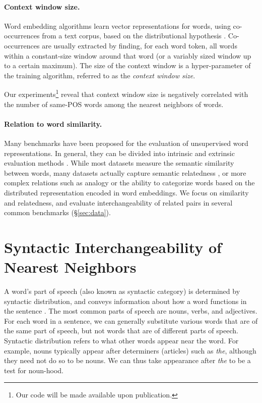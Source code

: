 \documentclass[11pt,a4paper]{article}
\begin{document}
    \paragraph{Context window size.}
    Word embedding algorithms learn vector representations for words,
    using co-occurrences from a text corpus,
    based on the distributional hypothesis \cite{harris1954distributional}.
    Co-occurrences are usually extracted by finding, for each word token, all
    words within a constant-size window around that word (or a variably sized
    window up to a certain maximum).
    The size of the context window is a hyper-parameter of the training algorithm,
    referred to as the \textit{context window size}.

    Our experiments\footnote{Our code will be made available upon publication.}
    reveal that context window size is negatively correlated
    with the number of same-POS words among the nearest neighbors of words.
    
    \paragraph{Relation to word similarity.}
    
    Many benchmarks have been proposed for the evaluation of unsupervised word
    representations.
    In general, they can be divided into intrinsic and extrinsic evaluation methods
    \cite{schnabel2015evaluation,chiu2016intrinsic,jastrzebski2017evaluate,alshargi2018concept2vec,bakarov2018survey}.
    While most datasets measure the semantic similarity between words,
    many datasets actually capture semantic relatedness
    \cite{hill2015simlex,avraham2016improving},
    or more complex relations such as analogy or the ability to categorize
    words based on the distributed representation encoded in word embeddings.
    We focus on similarity and relatedness, and evaluate interchangeability
    of related pairs in several common benchmarks (\S\ref{sec:data}).
    
    \section{Syntactic Interchangeability of Nearest Neighbors}\label{sec:nn}
    
    A word's part of speech (also known as syntactic category)
    is determined by syntactic distribution, and
    conveys information about how a word functions in the sentence \cite{carnie2002syntax}.
    The most common parts of speech are nouns, verbs, and adjectives.
    For each word in a sentence,
    we can generally substitute various words that are of the same part of speech,
    but not words that are of different parts of speech.
    Syntactic distribution refers to what other words appear
    near the word. For example, nouns typically appear after determiners (articles)
    such as \textit{the}, although they need not do so to be nouns. We can thus
    take appearance after \textit{the} to be a test for noun-hood.
    
\end{document}
